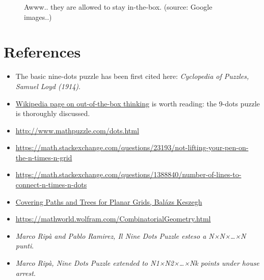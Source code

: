 \documentclass[11pt]{article}
\begin{document}
\begin{figure}[H]
\begin{subfigure}[b]{0.32\textwidth}
	\end{subfigure}
	\caption{Awww.. they are allowed to stay in-the-box. (source: Google images..)}
	\label{fig:cat-in-the-box}
\end{figure}

\hypertarget{references}{
	\section{References}
	\label{references}
}

\begin{itemize}
	\item
		The basic nine-dots puzzle has been first cited here: \emph{Cyclopedia of Puzzles, Samuel Loyd (1914)}.
	\item
		\href{https://en.wikipedia.org/wiki/Thinking_outside_the_box}{Wikipedia page on out-of-the-box thinking} is worth reading: the 9-dots puzzle is thoroughly discussed.
	\item
		\href{http://www.mathpuzzle.com/dots.html}{http://www.mathpuzzle.com/dots.html}
	\item
		\href{https://math.stackexchange.com/questions/23193/not-lifting-your-pen-on-the-n-times-n-grid}{https://math.stackexchange.com/questions/23193/not-lifting-your-pen-on-the-n-times-n-grid}
	\item
		\href{https://math.stackexchange.com/questions/1388840/number-of-lines-to-connect-n-times-n-dots}{https://math.stackexchange.com/questions/1388840/number-of-lines-to-connect-n-times-n-dots}
	\item
		\href{https://arxiv.org/abs/1311.0452}{Covering Paths and Trees for Planar Grids, Balázs Keszegh}
	\item
		\href{https://mathworld.wolfram.com/CombinatorialGeometry.html}{https://mathworld.wolfram.com/CombinatorialGeometry.html}
	\item
		\emph{Marco Ripà and Pablo Ramirez, Il Nine Dots Puzzle esteso a N×N×\ldots×N punti}.
	\item
		\emph{Marco Ripà, Nine Dots Puzzle extended to N1×N2×\ldots×Nk points 	under house arrest}.
\end{itemize}
\end{document}
